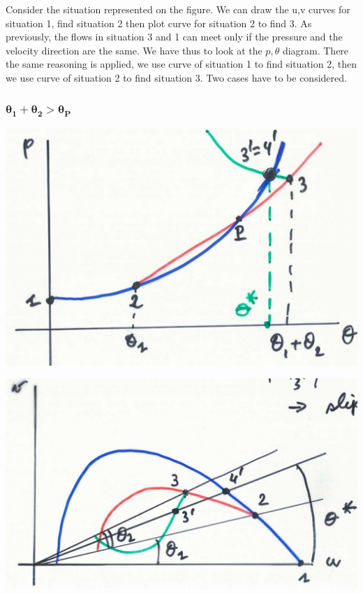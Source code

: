 Consider the situation represented on the figure. We can draw the u,v curves for situation 1, find situation 2 then plot curve for situation 2 to find 3. As previously, the flows in situation 3 and 1 can meet only if the pressure and the velocity direction are the same. We have thus to look at the $p,\theta$ diagram. There the same reasoning is applied, we use curve of situation 1 to find situation 2, then we use curve of situation 2 to find situation 3. Two cases have to be considered.

\subsubsection{$\bm{\theta _1 + \theta _2 > \theta _P}$}
\begin{center}
\begin{minipage}{0.33\textwidth}
\includegraphics[scale=0.2]{ch9/18}
\end{minipage}
\begin{minipage}{0.4\textwidth}
\includegraphics[scale=0.2]{ch9/19}
\end{minipage}
\end{center}

